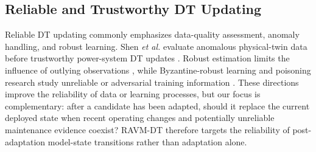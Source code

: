 \subsection{Reliable and Trustworthy DT Updating}
Reliable DT updating commonly emphasizes data-quality assessment, anomaly handling, and robust learning. Shen \emph{et al.} evaluate anomalous physical-twin data before trustworthy power-system DT updates \cite{shen2026trustworthy}. Robust estimation limits the influence of outlying observations \cite{huber1964robust}, while Byzantine-robust learning and poisoning research study unreliable or adversarial training information \cite{yin2018byzantine,biggio2012poisoning}. These directions improve the reliability of data or learning processes, but our focus is complementary: after a candidate has been adapted, should it replace the current deployed state when recent operating changes and potentially unreliable maintenance evidence coexist? RAVM-DT therefore targets the reliability of post-adaptation model-state transitions rather than adaptation alone.
